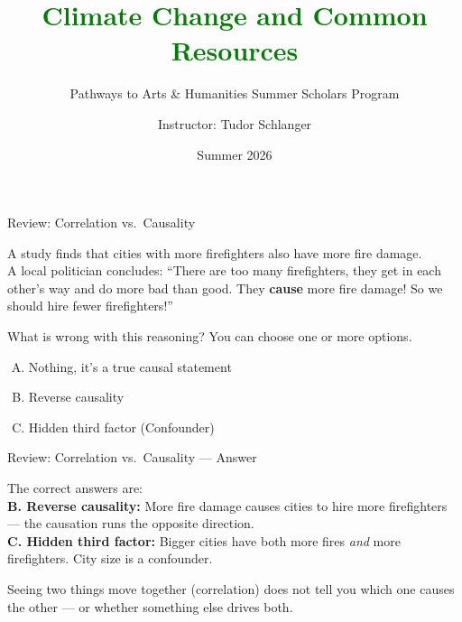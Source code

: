 \documentclass[9pt,english,aspectratio=169]{beamer}
\title{\textbf{\textcolor{green}{Climate Change and Common Resources}}}
\subtitle{Pathways to Arts \& Humanities Summer Scholars Program}
\author{Instructor: Tudor Schlanger}
\date{Summer 2026}
\begin{document}
\begin{frame}
  \titlepage
\end{frame}

\begin{frame}{Review: Correlation vs.\ Causality}

  \begin{questionbox}
    A study finds that cities with more firefighters also have
    more fire damage.  \\
    
    A local politician concludes:
    ``There are too many firefighters, they get in each other's way and do more bad than good. They \textbf{cause} more fire damage! So we should hire fewer firefighters!''

    \vspace{0.5em}
    What is wrong with this reasoning? You can choose one or more options. 
  \end{questionbox}

  \vspace{0.5em}
  \begin{enumerate}[A.]
    \item Nothing, it's a true causal statement
    \item Reverse causality
    \item Hidden third factor (Confounder)
  \end{enumerate}

\end{frame}

\begin{frame}{Review: Correlation vs.\ Causality --- Answer}

  \begin{answerbox}
    The correct answers are: \\[0.5em]
    \textbf{B. Reverse causality:} More fire damage causes cities to hire
    more firefighters --- the causation runs the opposite direction.\\[0.3em]
    \textbf{C. Hidden third factor:} Bigger cities have both more fires
    \emph{and} more firefighters. City size is a confounder.
  \end{answerbox}

  \vspace{0.5em}
  \begin{insightbox}
    Seeing two things move together (correlation) does not tell you
    which one causes the other --- or whether something else drives both.
  \end{insightbox}

\end{frame}
\end{document}
